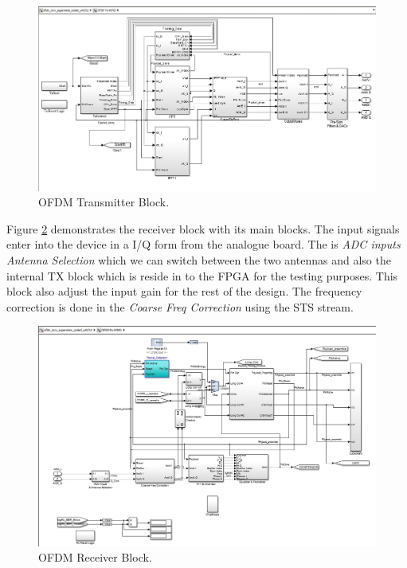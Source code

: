 \begin{figure}[h!]
\centering
\includegraphics[width=\textwidth]{content/fig/txblock.JPG}
\caption{OFDM Transmitter Block.}
\label{fig:tx_block}
\end{figure}

Figure \ref{fig:rx_block} demonstrates the receiver block with its main blocks. The input signals enter into the device in a I/Q form from the analogue board. The is \textit{ADC inputs Antenna Selection} which we can switch between the two antennas and also the internal TX block which is reside in to the FPGA for the testing purposes. This block also adjust the input gain for the rest of the design. The frequency correction is done in the \textit{Coarse Freq Correction} using the STS stream.\\

\begin{figure}
\centering
\includegraphics[width=\textwidth]{content/fig/rxblock.JPG}
\caption{OFDM Receiver Block.}
\label{fig:rx_block}
\end{figure}



